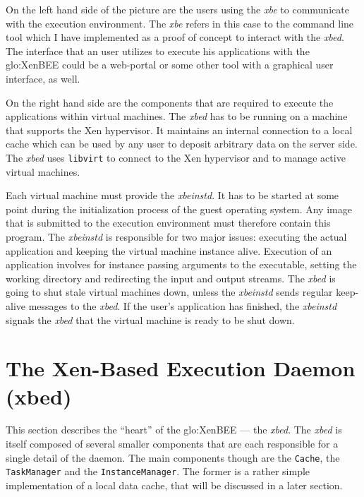 On the left hand side of the picture are the users using the \emph{xbe} to
communicate with the execution  environment. The \emph{xbe} refers in this
case  to the command  line tool  which I  have implemented  as a  proof of
concept  to interact  with the  \emph{xbed}.  The  interface that  an user
utilizes to execute his applications  with the \gls{glo:XenBEE} could be a
web-portal or some other tool with a graphical user interface, as well.

\medskip

On the right hand side are the components that are required to execute the
applications within  virtual machines.  The \emph{xbed} has  to be running
on a machine  that supports the Xen hypervisor.   It maintains an internal
connection  to a local  cache which  can be  used by  any user  to deposit
arbitrary data on the  server side.  The \emph{xbed} uses \texttt{libvirt}
to connect to the Xen hypervisor and to manage active virtual machines.

Each  virtual machine  must  provide  the \emph{xbeinstd}.  It  has to  be
started  at some  point during  the  initialization process  of the  guest
operating system. Any image that is submitted to the execution environment
must therefore  contain this  program. The \emph{xbeinstd}  is responsible
for two  major issues:  executing the actual  application and  keeping the
virtual machine instance alive.   Execution of an application involves for
instance  passing  arguments  to   the  executable,  setting  the  working
directory and redirecting the input and output streams. The \emph{xbed} is
going  to shut  stale virtual  machines down,  unless  the \emph{xbeinstd}
sends  regular keep-alive  messages  to the  \emph{xbed}.   If the  user's
application has finished, the \emph{xbeinstd} signals the \emph{xbed} that
the virtual machine is ready to be shut down.

\section[The Xen-Based Execution Daemon]{The Xen-Based Execution Daemon (xbed)}
\label{sec:xbed}

This  section describes  the  ``heart'' of  the  \gls{glo:XenBEE} ---  the
\emph{xbed}.   The  \emph{xbed}  is  itself composed  of  several  smaller
components that  are each responsible for  a single detail  of the daemon.
The    main    components    though    are   the    \texttt{Cache},    the
\texttt{TaskManager}  and the  \texttt{InstanceManager}. The  former  is a
rather simple implementation of a local data cache, that will be discussed
in a later section.

